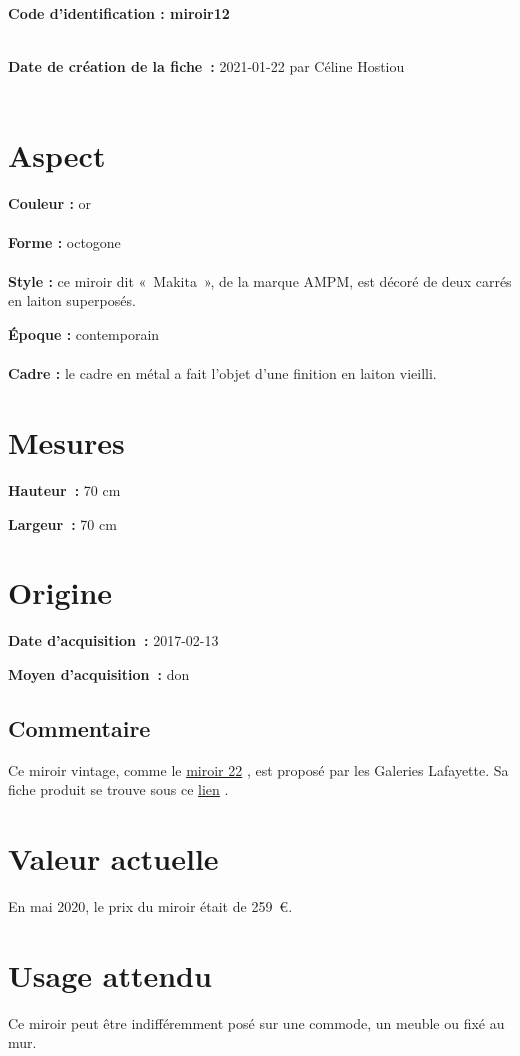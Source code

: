  
    
    
    {\bf \huge Code d’identification : miroir12}
    \\ \\ \hr
    \begin{center}
    \end{center}
    
    {\bf \large Date de création de la fiche :} 2021-01-22
    {par Céline Hostiou}
   \\ \\ \hr
    \section* {Aspect}
   {\bf \large Couleur :} or
    \\ \\ {\bf \large Forme :}  octogone
    \\ \\ {\bf \large Style :} 
            ce miroir dit « Makita », de la marque AMPM, est décoré de deux carrés en laiton superposés.
        
        {\bf \large Époque :} contemporain
    \\ \\ {\bf \large Cadre :} le cadre en métal a fait l’objet d'une finition en laiton vieilli.
    \section* {Mesures}
      
  {\bf \large Hauteur :} 70 cm
   
   {\bf \large Largeur :} 70 cm
     
    \section* {Origine}
    {\bf \large Date d’acquisition :} 2017-02-13

    {\bf \large Moyen d’acquisition :} don
      \subsection* {Commentaire}
       
    
Ce miroir vintage, comme le 
    \href{miroir22.xml}{miroir
                22}
  , est proposé par les Galeries Lafayette. Sa fiche produit se trouve sous ce  
    \href{https://www.galerieslafayette.com/p/miroir+metal+finition+vieillie+makita-ampm/300407151727/347}{lien}
  . 
    

      \section* {Valeur actuelle} En mai 2020, le prix du miroir était de 259 €.
      \section* {Usage attendu}  
    
Ce miroir peut être indifféremment posé sur une commode, un meuble ou fixé au mur. 
    

    
  